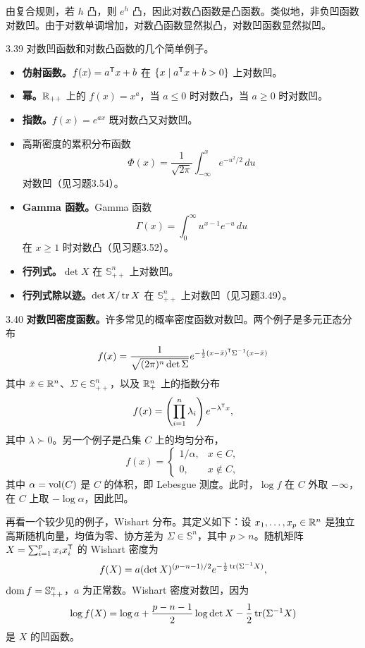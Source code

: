 由复合规则，若 $h$ 凸，则 $e^h$ 凸，因此对数凸函数是凸函数。类似地，非负凹函数对数凹。由于对数单调增加，对数凸函数显然拟凸，对数凹函数显然拟凹。
\begin{origexample}{3.39}
对数凹函数和对数凸函数的几个简单例子。
\begin{itemize}
\item \textbf{仿射函数。}$f(x)=a^\mathsf T x+b$ 在 $\{x\mid a^\mathsf T x+b>0\}$ 上对数凹。
\item \textbf{幂。}$\mathbb R_{++}$ 上的 $f(x)=x^a$，当 $a\leq0$ 时对数凸，当 $a\geq0$ 时对数凹。
\item \textbf{指数。}$f(x)=e^{ax}$ 既对数凸又对数凹。
\item 高斯密度的累积分布函数
\[\Phi(x)=\frac1{\sqrt{2\pi}}\int_{-\infty}^x e^{-u^2/2}\,du\]
对数凹（见习题3.54）。
\item \textbf{Gamma 函数。}Gamma 函数
\[\Gamma(x)=\int_0^\infty u^{x-1}e^{-u}\,du\]
在 $x\geq1$ 时对数凸（见习题3.52）。
\item \textbf{行列式。}$\det X$ 在 $\mathbb S_{++}^n$ 上对数凹。
\item \textbf{行列式除以迹。}$\det X/\operatorname{tr} X$ 在 $\mathbb S_{++}^n$ 上对数凹（见习题3.49）。
\end{itemize}
\end{origexample}
\begin{origexample}{3.40}
\textbf{对数凹密度函数。}许多常见的概率密度函数对数凹。两个例子是多元正态分布
\[f(x)=\frac1{\sqrt{(2\pi)^n\det\Sigma}}
 e^{-\frac12(x-\bar x)^\mathsf T\Sigma^{-1}(x-\bar x)}\]
其中 $\bar x\in\mathbb R^n$、$\Sigma\in\mathbb S_{++}^n$，以及 $\mathbb R_+^n$ 上的指数分布
\[f(x)=\left(\prod_{i=1}^n\lambda_i\right)e^{-\lambda^\mathsf T x},\]
其中 $\lambda\succ0$。另一个例子是凸集 $C$ 上的均匀分布，
\[f(x)=\begin{cases}1/\alpha,&x\in C,\\0,&x\notin C,\end{cases}\]
其中 $\alpha=\operatorname{vol}(C)$ 是 $C$ 的体积，即 Lebesgue 测度。此时，$\log f$ 在 $C$ 外取 $-\infty$，在 $C$ 上取 $-\log\alpha$，因此凹。

再看一个较少见的例子，Wishart 分布。其定义如下：设 $x_1,\ldots,x_p\in\mathbb R^n$ 是独立高斯随机向量，均值为零、协方差为 $\Sigma\in\mathbb S^n$，其中 $p>n$。随机矩阵 $X=\sum_{i=1}^p x_ix_i^\mathsf T$ 的 Wishart 密度为
\[f(X)=a(\det X)^{(p-n-1)/2}e^{-\frac12\operatorname{tr}(\Sigma^{-1}X)},\]
$\operatorname{dom} f=\mathbb S_{++}^n$，$a$ 为正常数。Wishart 密度对数凹，因为
\[\log f(X)=\log a+\frac{p-n-1}2\log\det X-\frac12\operatorname{tr}(\Sigma^{-1}X)\]
是 $X$ 的凹函数。
\end{origexample}
